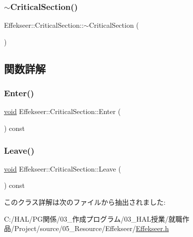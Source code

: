 \mbox{\label{class_effekseer_1_1_critical_section_a5748b4aa5c32883ae097944dc12466aa}} 
\subsubsection{\texorpdfstring{$\sim$\+Critical\+Section()}{~CriticalSection()}}
{\footnotesize\ttfamily Effekseer\+::\+Critical\+Section\+::$\sim$\+Critical\+Section (\begin{DoxyParamCaption}{ }\end{DoxyParamCaption})}



\subsection{関数詳解}
\mbox{\label{class_effekseer_1_1_critical_section_a732f99c9be62af56becb34e12194adcf}} 
\subsubsection{\texorpdfstring{Enter()}{Enter()}}
{\footnotesize\ttfamily \mbox{\hyperlink{namespace_effekseer_ab34c4088e512200cf4c2716f168deb56}{void}} Effekseer\+::\+Critical\+Section\+::\+Enter (\begin{DoxyParamCaption}{ }\end{DoxyParamCaption}) const}

\mbox{\label{class_effekseer_1_1_critical_section_accefef1ff9d9de4f92269aa005f50007}} 
\subsubsection{\texorpdfstring{Leave()}{Leave()}}
{\footnotesize\ttfamily \mbox{\hyperlink{namespace_effekseer_ab34c4088e512200cf4c2716f168deb56}{void}} Effekseer\+::\+Critical\+Section\+::\+Leave (\begin{DoxyParamCaption}{ }\end{DoxyParamCaption}) const}



このクラス詳解は次のファイルから抽出されました\+:\begin{DoxyCompactItemize}
\item 
C\+:/\+H\+A\+L/\+P\+G関係/03\+\_\+作成プログラム/03\+\_\+\+H\+A\+L授業/就職作品/\+Project/source/05\+\_\+\+Resource/\+Effekseer/\mbox{\hyperlink{_effekseer_8h}{Effekseer.\+h}}\end{DoxyCompactItemize}
